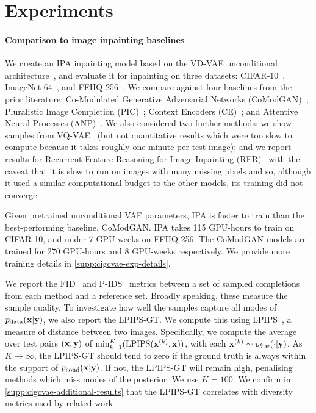 \section{Experiments} \label{sec:cigcvae-experiments}

\paragraph{Comparison to image inpainting baselines}

We create an IPA inpainting model based on the VD-VAE unconditional
architecture~\citep{child2020very}, and evaluate it for inpainting on
three datasets: CIFAR-10~\citep{krizhevsky2009learning},
ImageNet-64~\citep{deng2009imagenet}, and FFHQ-256~\citep{karras2019style}. We
compare against four baselines from the prior literature: Co-Modulated Generative Adversarial Networks
(CoModGAN)~\citep{zhao2021large}; Pluralistic Image Completion
(PIC)~\citep{zheng2019pluralistic}; Context Encoders
(CE)~\citep{pathak2016context}; and Attentive Neural Processes
(ANP)~\citep{kim2019attentive}. We also considered two further methods: we show
samples from VQ-VAE~\citep{peng2021generating} (but not quantitative results
which were too slow to compute because it takes roughly one minute per test
image); and we report results for Recurrent Feature Reasoning for Image
Inpainting (RFR)~\citep{li2020recurrent} with the caveat that it is slow to run
on images with many missing pixels and so, although it used a similar
computational budget to the other models, its training did not converge.

Given pretrained unconditional VAE parameters, IPA is faster to train than the
best-performing baseline, CoModGAN. IPA takes 115 GPU-hours to train on
CIFAR-10, and under 7 GPU-weeks on FFHQ-256. The CoModGAN models are trained for
270 GPU-hours and 8 GPU-weeks respectively. We provide more training details in
\cref{supp:cigcvae-exp-details}.

We report the FID~\citep{heusel2017gans} and P-IDS~\citep{zhao2021large} metrics
between a set of sampled completions from each method and a reference set.
Broadly speaking, these measure the sample quality.
%
To investigate how well the samples capture all modes of
$p_{\rm{data}}({\mathbf{x}}|{\mathbf{y}})$, we also report the LPIPS-GT. We compute this using
LPIPS~\citep{zhang2018unreasonable}, a measure of distance between two images.
Specifically, we compute the average over test pairs $({\mathbf{x}}, {\mathbf{y}})$ of
$\min_{k=1}^K(\text{LPIPS}({\mathbf{x}}^{(k)} , {\mathbf{x}}))$, with each ${\mathbf{x}}^{(k)} \sim
p_{\theta,\psi}(\cdot | {\mathbf{y}})$. As $K \rightarrow \infty$, the LPIPS-GT should tend
to zero if the ground truth is always within the support of
$p_{\text{cond}}({\mathbf{x}}|{\mathbf{y}})$. If not, the LPIPS-GT will remain high, penalising
methods which miss modes of the posterior. We use $K=100$. We confirm in
\cref{supp:cigcvae-additional-results} that the LPIPS-GT correlates with diversity
metrics used by related work~\citep{zhu2017toward,li2020multimodal}.


